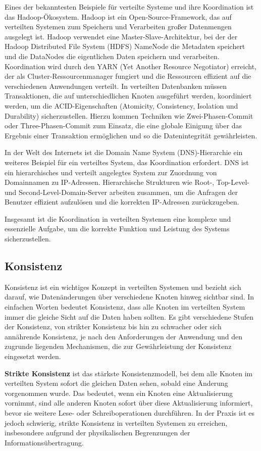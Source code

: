 \documentclass[../vs-script-first-v01.tex]{subfiles}
\begin{document}
Eines der bekanntesten Beispiele für verteilte Systeme und ihre Koordination ist das Hadoop-Ökosystem. Hadoop ist ein Open-Source-Framework, das auf verteilten Systemen zum Speichern und Verarbeiten großer Datenmengen ausgelegt ist. Hadoop verwendet eine Master-Slave-Architektur, bei der der Hadoop Distributed File System (HDFS) NameNode die Metadaten speichert und die DataNodes die eigentlichen Daten speichern und verarbeiten. Koordination wird durch den YARN (Yet Another Resource Negotiator) erreicht, der als Cluster-Ressourcenmanager fungiert und die Ressourcen effizient auf die verschiedenen Anwendungen verteilt. In verteilten Datenbanken müssen Transaktionen, die auf unterschiedlichen Knoten ausgeführt werden, koordiniert werden, um die ACID-Eigenschaften (Atomicity, Consistency, Isolation und Durability) sicherzustellen. Hierzu kommen Techniken wie Zwei-Phasen-Commit oder Three-Phasen-Commit zum Einsatz, die eine globale Einigung über das Ergebnis einer Transaktion ermöglichen und so die Datenintegrität gewährleisten.

In der Welt des Internets ist die Domain Name System (DNS)-Hierarchie ein weiteres Beispiel für ein verteiltes System, das Koordination erfordert. DNS ist ein hierarchisches und verteilt angelegtes System zur Zuordnung von Domainnamen zu IP-Adressen. Hierarchische Strukturen wie Root-, Top-Level- und Second-Level-Domain-Server arbeiten zusammen, um die Anfragen der Benutzer effizient aufzulösen und die korrekten IP-Adressen zurückzugeben.

Insgesamt ist die Koordination in verteilten Systemen eine komplexe und essenzielle Aufgabe, um die korrekte Funktion und Leistung des Systems sicherzustellen. 

\subsection{Konsistenz}

Konsistenz ist ein wichtiges Konzept in verteilten Systemen und bezieht sich darauf, wie Datenänderungen über verschiedene Knoten hinweg sichtbar sind. In einfachen Worten bedeutet Konsistenz, dass alle Knoten im verteilten System immer die gleiche Sicht auf die Daten haben sollten. Es gibt verschiedene Stufen der Konsistenz, von strikter Konsistenz bis hin zu schwacher oder sich annährende Konsistenz, je nach den Anforderungen der Anwendung und den zugrunde liegenden Mechanismen, die zur Gewährleistung der Konsistenz eingesetzt werden.

\textbf{Strikte Konsistenz} ist das stärkste Konsistenzmodell, bei dem alle Knoten im verteilten System sofort die gleichen Daten sehen, sobald eine Änderung vorgenommen wurde. Das bedeutet, wenn ein Knoten eine Aktualisierung vornimmt, sind alle anderen Knoten sofort über diese Aktualisierung informiert, bevor sie weitere Lese- oder Schreiboperationen durchführen. In der Praxis ist es jedoch schwierig, strikte Konsistenz in verteilten Systemen zu erreichen, insbesondere aufgrund der physikalischen Begrenzungen der Informationsübertragung.
\end{document}
